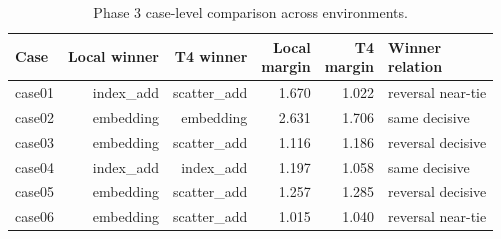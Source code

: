 \begin{table}[t]
\centering
\fontsize{9}{11}\selectfont
\caption{Phase 3 case-level comparison across environments.}
\label{tab:phase3-case-comparison}
\setlength{\tabcolsep}{3pt}
\renewcommand{\arraystretch}{1.12}
\begin{tabular*}{\textwidth}{@{\extracolsep{\fill}}lrrrrl@{}}
\toprule
Case & Local winner & T4 winner & \shortstack{Local\\margin} & \shortstack{T4\\margin} & \shortstack{Winner\\relation} \\
\midrule
case01 & index\_add & scatter\_add & 1.670 & 1.022 & reversal near-tie \\
case02 & embedding & embedding & 2.631 & 1.706 & same decisive \\
case03 & embedding & scatter\_add & 1.116 & 1.186 & reversal decisive \\
case04 & index\_add & index\_add & 1.197 & 1.058 & same decisive \\
case05 & embedding & scatter\_add & 1.257 & 1.285 & reversal decisive \\
case06 & embedding & scatter\_add & 1.015 & 1.040 & reversal near-tie \\
\bottomrule
\end{tabular*}
\end{table}